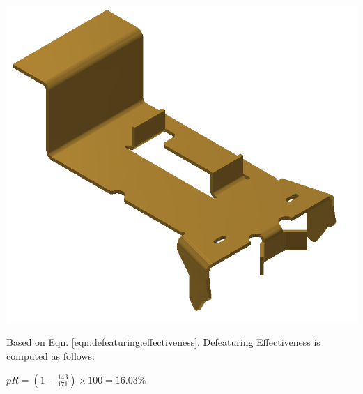 \begin{minipage}{\linewidth}
\begin{minipage}[c]{0.62\linewidth}
\includegraphics[width=\linewidth,valign=t]{images/CommercialBracket_Defeatured_model}
 \label{fig:results:CommercialBracket_Defeatured_model}


Based on Eqn. \ref{eqn:defeaturing:effectiveness}. Defeaturing Effectiveness is computed as follows:

$pR = (1 - \frac{143}{171}) \times 100 = 16.03\%$


\end{minipage}
\end{minipage}
